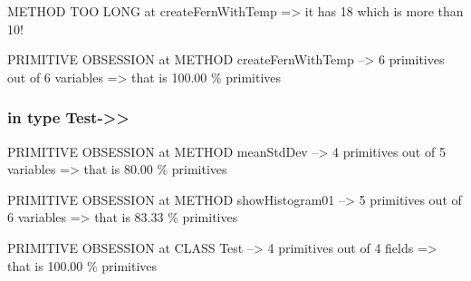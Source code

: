 \documentclass[a4paper]{article}
\begin{document}
\begin{flushleft}
	METHOD TOO LONG at createFernWithTemp =\textgreater{} it has 18 which is
	more than 10!

	PRIMITIVE OBSESSION at METHOD createFernWithTemp --\textgreater{} 6
	primitives out of 6 variables =\textgreater{} that is 100.00 \%
	primitives

	\subsubsection{in type Test-\textgreater{}\textgreater{}}\label{in-type-test-}

	PRIMITIVE OBSESSION at METHOD meanStdDev --\textgreater{} 4 primitives
	out of 5 variables =\textgreater{} that is 80.00 \% primitives

	PRIMITIVE OBSESSION at METHOD showHistogram01 --\textgreater{} 5
	primitives out of 6 variables =\textgreater{} that is 83.33 \%
	primitives

	PRIMITIVE OBSESSION at CLASS Test --\textgreater{} 4 primitives out of 4
	fields =\textgreater{} that is 100.00 \% primitives

\end{flushleft}
\end{document}
